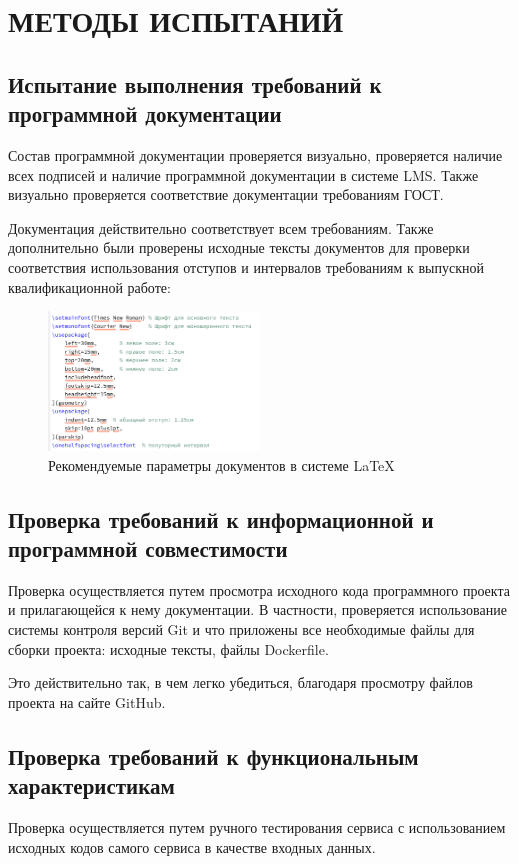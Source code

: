 \section{МЕТОДЫ ИСПЫТАНИЙ}

\subsection{Испытание выполнения требований к программной документации}
     Состав программной документации проверяется визуально, проверяется наличие всех подписей и наличие программной документации в системе LMS. Также визуально проверяется соответствие документации требованиям ГОСТ.
     
     Документация действительно соответствует всем требованиям. Также дополнительно были проверены исходные тексты документов для проверки соответствия использования отступов и интервалов требованиям к выпускной квалификационной работе:
     
    \begin{figure}[H]
        \centering
        \includegraphics[width=0.5\textwidth]{figures/latex.png}
        \caption{Рекомендуемые параметры документов в системе LaTeX}
        \label{fig:my_label}
    \end{figure}

\subsection{Проверка требований к информационной и программной совместимости}
    Проверка осуществляется путем просмотра исходного кода программного проекта и прилагающейся к нему документации. В частности, проверяется использование системы контроля версий Git и что приложены все необходимые файлы для сборки проекта: исходные тексты, файлы Dockerfile.
    
    Это действительно так, в чем легко убедиться, благодаря просмотру файлов проекта на сайте GitHub.

\subsection{Проверка требований к функциональным характеристикам}
    Проверка осуществляется путем ручного тестирования сервиса с использованием исходных кодов самого сервиса в качестве входных данных.
    
